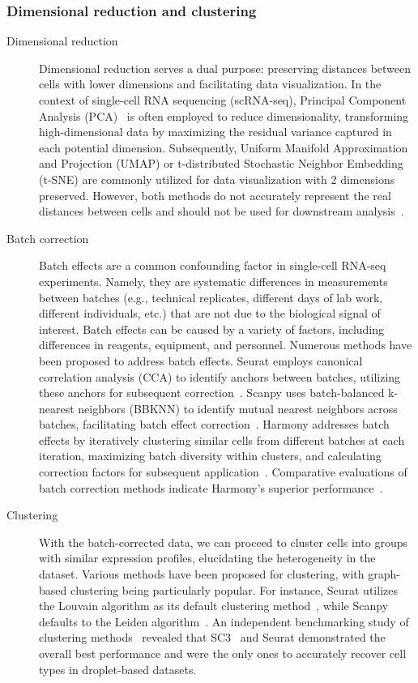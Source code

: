 \subsubsection{Dimensional reduction and clustering}
\label{background:sec2:dr_n_clustering}
\begin{description}
	\item[Dimensional reduction]
	Dimensional reduction serves a dual purpose: preserving distances between cells with lower dimensions and facilitating data visualization. In the context of single-cell RNA sequencing (scRNA-seq), Principal Component Analysis (PCA)~\citep{hotelling1933pca} is often employed to reduce dimensionality, transforming high-dimensional data by maximizing the residual variance captured in each potential dimension. Subsequently, Uniform Manifold Approximation and Projection (UMAP) or t-distributed Stochastic Neighbor Embedding (t-SNE) are commonly utilized for data visualization with 2 dimensions preserved. However, both methods do not accurately represent the real distances between cells and should not be used for downstream analysis~\citep{mcinnes2018umap, van2008tsne}.

	\item[Batch correction]
	Batch effects are a common confounding factor in single-cell RNA-seq experiments. Namely, they are systematic differences in measurements between batches (e.g., technical replicates, different days of lab work, different individuals, etc.) that are not due to the biological signal of interest. Batch effects can be caused by a variety of factors, including differences in reagents, equipment, and personnel. Numerous methods have been proposed to address batch effects. Seurat employs canonical correlation analysis (CCA) to identify anchors between batches, utilizing these anchors for subsequent correction~\citep{stuart2019seurat3}. Scanpy uses batch-balanced k-nearest neighbors (BBKNN) to identify mutual nearest neighbors across batches, facilitating batch effect correction~\citep{polanski2020bbknn}. Harmony addresses batch effects by iteratively clustering similar cells from different batches at each iteration, maximizing batch diversity within clusters, and calculating correction factors for subsequent application~\citep{korsunsky2019harmony}. Comparative evaluations of batch correction methods indicate Harmony's superior performance~\citep{tran2020benchmark}.

	\item[Clustering]
	With the batch-corrected data, we can proceed to cluster cells into groups with similar expression profiles, elucidating the heterogeneity in the dataset. Various methods have been proposed for clustering, with graph-based clustering being particularly popular. For instance, Seurat utilizes the Louvain algorithm as its default clustering method~\citep{stuart2019seurat3}, while Scanpy defaults to the Leiden algorithm~\citep{traag2019louvain}. An independent benchmarking study of clustering methods~\citep{duo2018benchclustering} revealed that SC3~\citep{kiselev2017sc3} and Seurat demonstrated the overall best performance and were the only ones to accurately recover cell types in droplet-based datasets.

\end{description}

